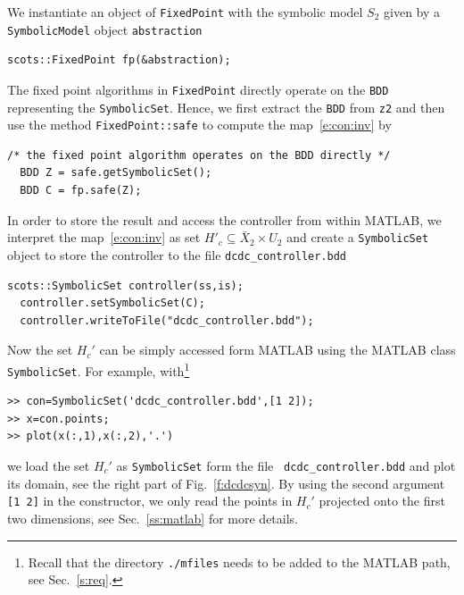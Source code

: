 \documentclass[a4paper]{amsart}
\begin{document}
We instantiate an object of {\tt\small FixedPoint} with the symbolic model $S_2$
given by a {\tt\small SymbolicModel} object {\tt\small abstraction}
\begin{lstlisting}[basicstyle=\footnotesize\ttfamily]
  scots::FixedPoint fp(&abstraction);
\end{lstlisting}
The fixed point algorithms in {\tt\small FixedPoint} directly operate on the
{\tt\small BDD} representing the {\tt\small SymbolicSet}. Hence, we first
extract the {\tt\small BDD} from {\tt\small z2} and then use the method {\tt\small FixedPoint::safe} to compute the map~\eqref{e:con:inv} by
\begin{lstlisting}[basicstyle=\footnotesize\ttfamily]
  /* the fixed point algorithm operates on the BDD directly */
  BDD Z = safe.getSymbolicSet();
  BDD C = fp.safe(Z);
\end{lstlisting}
In order to store the result and access the controller from within MATLAB, we
interpret the map~\eqref{e:con:inv} as set $H'_c\subseteq \bar X_2\times U_2$
and create a {\tt\small SymbolicSet} object to store the controller to the file {\tt\small dcdc\_controller.bdd}
\begin{lstlisting}[basicstyle=\footnotesize\ttfamily]
	scots::SymbolicSet controller(ss,is);                                                                                                                                                                                                                                                                                                                                    
  controller.setSymbolicSet(C);
  controller.writeToFile("dcdc_controller.bdd");
\end{lstlisting}
Now the set $H_c'$ can be simply accessed form MATLAB using the MATLAB class {\tt\small SymbolicSet}. For example, with\footnote{Recall that the directory {\tt ./mfiles} needs to be added to the MATLAB path, see Sec.~\ref{s:req}.}
\begin{lstlisting}[basicstyle=\footnotesize\ttfamily]
>> con=SymbolicSet('dcdc_controller.bdd',[1 2]);
>> x=con.points;
>> plot(x(:,1),x(:,2),'.')
\end{lstlisting}
we load the set $H_c'$ as {\tt\small SymbolicSet} form the file {\tt\small
dcdc\_controller.bdd} and plot its domain, see the right part of Fig.~\ref{f:dcdcsyn}. By using the second argument {\tt\small [1 2]} in the
constructor, we only read the points in $H_c'$ projected onto the first two dimensions, see Sec.~\ref{ss:matlab} for more details.
\end{document}
